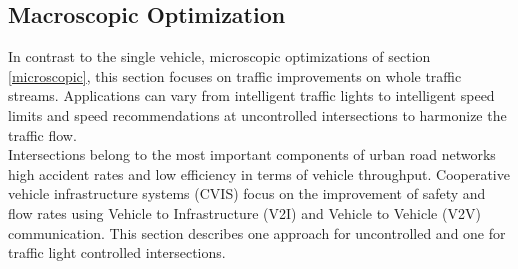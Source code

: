 \documentclass{sig-alternate}
\begin{document}
\subsection{Macroscopic Optimization}
In contrast to the single vehicle, microscopic optimizations of section \ref{microscopic}, this section focuses on traffic improvements on whole traffic streams.
Applications can vary from intelligent traffic lights to intelligent speed limits and speed recommendations at uncontrolled intersections to harmonize the traffic flow. \\
Intersections belong to the most important components of urban road networks  high accident rates and low efficiency in terms of vehicle throughput. Cooperative vehicle infrastructure systems (CVIS) focus on the improvement of safety and flow rates using Vehicle to Infrastructure (V2I) and Vehicle to Vehicle (V2V) communication. This section describes one approach for uncontrolled and one for traffic light controlled intersections. \\
\end{document}
